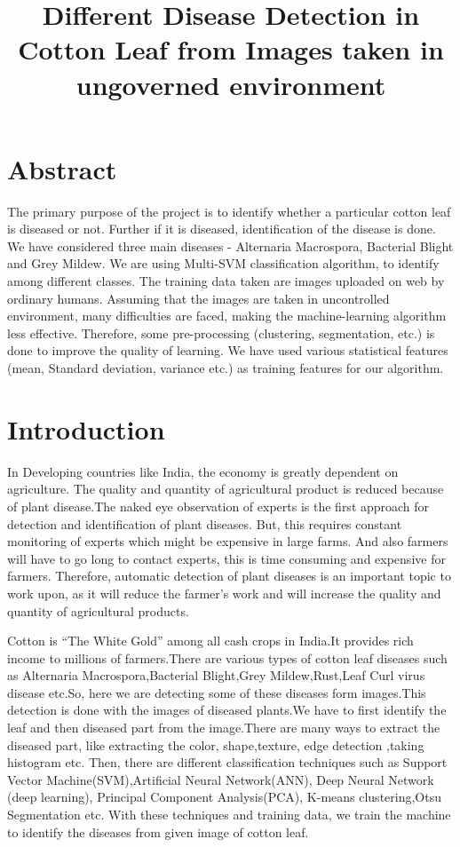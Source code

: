 \documentclass[conference]{IEEEtran}
\title{Different Disease Detection in Cotton Leaf from Images taken in ungoverned environment}
\author{
\IEEEauthorblockN{Honey Gadhiya, Ishika Agarwal, 
Nivedita Rao, Pooja Langhnoda }

}
\begin{document}
\maketitle
\thispagestyle{empty}
\pagestyle{empty}


\section{Abstract}
The primary purpose of the project is to identify whether a particular cotton leaf is diseased or not. Further if it is diseased, identification of the disease is done. We have considered three main diseases - Alternaria Macrospora, Bacterial Blight and Grey Mildew. We are using Multi-SVM classification algorithm, to identify among different classes. The training data taken are images uploaded on web by ordinary humans. Assuming that the images are taken in uncontrolled environment, many difficulties are faced, making the machine-learning algorithm less effective. Therefore, some pre-processing (clustering, segmentation, etc.) is done to improve the quality of learning. We have used various statistical features (mean, Standard deviation, variance etc.) as training features for our algorithm. 

\bigskip
\section{Introduction}
In Developing countries like India, the economy is greatly dependent on agriculture. The quality and quantity of agricultural product is reduced because of plant disease.The naked eye observation of experts is the first approach for detection and identification of plant diseases. But, this requires constant monitoring of experts which might be expensive in large farms. And also farmers will have to go long to contact experts, this is time consuming and expensive for farmers. Therefore, automatic detection of plant diseases is an important topic to work upon, as it will reduce the farmer’s work and will increase the quality and quantity of agricultural products.

\bigskip
	Cotton is “The White Gold” among all cash crops in India.It provides rich income to millions of farmers.There are various types of cotton leaf diseases such as Alternaria Macrospora,Bacterial Blight,Grey Mildew,Rust,Leaf Curl virus disease etc.So, here we are detecting some of these diseases form images.This detection is done with the images of diseased plants.We have to first identify the leaf and then diseased part from the image.There are many ways to extract the diseased part, like extracting the color, shape,texture, edge detection ,taking histogram etc. Then, there are different classification techniques such as Support Vector Machine(SVM),Artificial Neural Network(ANN), Deep Neural Network (deep learning), Principal Component Analysis(PCA), K-means clustering,Otsu Segmentation etc. With these techniques and training data, we train the machine to identify the diseases from given image of cotton leaf.
\end{document}
